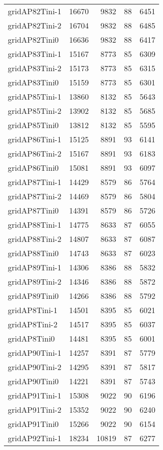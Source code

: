 \begin{longtable}{lrrrr}
gridAP82Tini-1 & 16670 & 9832 & 88 & 6451 \\
gridAP82Tini-2 & 16704 & 9832 & 88 & 6485 \\
gridAP82Tini0 & 16636 & 9832 & 88 & 6417 \\
gridAP83Tini-1 & 15167 & 8773 & 85 & 6309 \\
gridAP83Tini-2 & 15173 & 8773 & 85 & 6315 \\
gridAP83Tini0 & 15159 & 8773 & 85 & 6301 \\
gridAP85Tini-1 & 13860 & 8132 & 85 & 5643 \\
gridAP85Tini-2 & 13902 & 8132 & 85 & 5685 \\
gridAP85Tini0 & 13812 & 8132 & 85 & 5595 \\
gridAP86Tini-1 & 15125 & 8891 & 93 & 6141 \\
gridAP86Tini-2 & 15167 & 8891 & 93 & 6183 \\
gridAP86Tini0 & 15081 & 8891 & 93 & 6097 \\
gridAP87Tini-1 & 14429 & 8579 & 86 & 5764 \\
gridAP87Tini-2 & 14469 & 8579 & 86 & 5804 \\
gridAP87Tini0 & 14391 & 8579 & 86 & 5726 \\
gridAP88Tini-1 & 14775 & 8633 & 87 & 6055 \\
gridAP88Tini-2 & 14807 & 8633 & 87 & 6087 \\
gridAP88Tini0 & 14743 & 8633 & 87 & 6023 \\
gridAP89Tini-1 & 14306 & 8386 & 88 & 5832 \\
gridAP89Tini-2 & 14346 & 8386 & 88 & 5872 \\
gridAP89Tini0 & 14266 & 8386 & 88 & 5792 \\
gridAP8Tini-1 & 14501 & 8395 & 85 & 6021 \\
gridAP8Tini-2 & 14517 & 8395 & 85 & 6037 \\
gridAP8Tini0 & 14481 & 8395 & 85 & 6001 \\
gridAP90Tini-1 & 14257 & 8391 & 87 & 5779 \\
gridAP90Tini-2 & 14295 & 8391 & 87 & 5817 \\
gridAP90Tini0 & 14221 & 8391 & 87 & 5743 \\
gridAP91Tini-1 & 15308 & 9022 & 90 & 6196 \\
gridAP91Tini-2 & 15352 & 9022 & 90 & 6240 \\
gridAP91Tini0 & 15266 & 9022 & 90 & 6154 \\
gridAP92Tini-1 & 18234 & 10819 & 87 & 6277 \\

\end{longtable}

